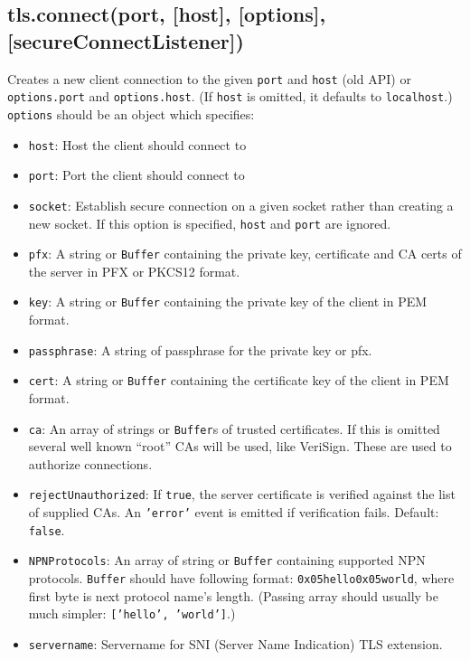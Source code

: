 \subsection{tls.connect(port, {[}host{]}, {[}options{]},
{[}secureConnectListener{]})}

Creates a new client connection to the given \texttt{port} and
\texttt{host} (old API) or \texttt{options.port} and
\texttt{options.host}. (If \texttt{host} is omitted, it defaults to
\texttt{localhost}.) \texttt{options} should be an object which
specifies:

\begin{itemize}
\item
  \texttt{host}: Host the client should connect to
\item
  \texttt{port}: Port the client should connect to
\item
  \texttt{socket}: Establish secure connection on a given socket rather
  than creating a new socket. If this option is specified, \texttt{host}
  and \texttt{port} are ignored.
\item
  \texttt{pfx}: A string or \texttt{Buffer} containing the private key,
  certificate and CA certs of the server in PFX or PKCS12 format.
\item
  \texttt{key}: A string or \texttt{Buffer} containing the private key
  of the client in PEM format.
\item
  \texttt{passphrase}: A string of passphrase for the private key or
  pfx.
\item
  \texttt{cert}: A string or \texttt{Buffer} containing the certificate
  key of the client in PEM format.
\item
  \texttt{ca}: An array of strings or \texttt{Buffer}s of trusted
  certificates. If this is omitted several well known ``root'' CAs will
  be used, like VeriSign. These are used to authorize connections.
\item
  \texttt{rejectUnauthorized}: If \texttt{true}, the server certificate
  is verified against the list of supplied CAs. An \texttt{'error'}
  event is emitted if verification fails. Default: \texttt{false}.
\item
  \texttt{NPNProtocols}: An array of string or \texttt{Buffer}
  containing supported NPN protocols. \texttt{Buffer} should have
  following format: \texttt{0x05hello0x05world}, where first byte is
  next protocol name's length. (Passing array should usually be much
  simpler: \texttt{{[}'hello', 'world'{]}}.)
\item
  \texttt{servername}: Servername for SNI (Server Name Indication) TLS
  extension.
\end{itemize}


